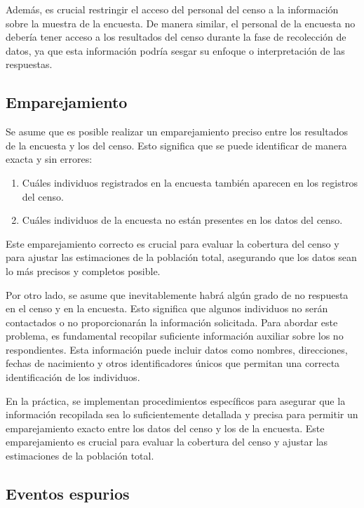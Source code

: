 \documentclass[
  12pt,
]{book}
\providecommand{\tightlist}{%
  \setlength{\itemsep}{0pt}\setlength{\parskip}{0pt}}
\begin{document}
Además, es crucial restringir el acceso del personal del censo a la información sobre la muestra de la encuesta. De manera similar, el personal de la encuesta no debería tener acceso a los resultados del censo durante la fase de recolección de datos, ya que esta información podría sesgar su enfoque o interpretación de las respuestas.

\subsection{Emparejamiento}\label{emparejamiento}

Se asume que es posible realizar un emparejamiento preciso entre los resultados de la encuesta y los del censo. Esto significa que se puede identificar de manera exacta y sin errores:

\begin{enumerate}
\def\labelenumi{\arabic{enumi}.}
\tightlist
\item
  Cuáles individuos registrados en la encuesta también aparecen en los registros del censo.
\item
  Cuáles individuos de la encuesta no están presentes en los datos del censo.
\end{enumerate}

Este emparejamiento correcto es crucial para evaluar la cobertura del censo y para ajustar las estimaciones de la población total, asegurando que los datos sean lo más precisos y completos posible.

Por otro lado, se asume que inevitablemente habrá algún grado de no respuesta en el censo y en la encuesta. Esto significa que algunos individuos no serán contactados o no proporcionarán la información solicitada. Para abordar este problema, es fundamental recopilar suficiente información auxiliar sobre los no respondientes. Esta información puede incluir datos como nombres, direcciones, fechas de nacimiento y otros identificadores únicos que permitan una correcta identificación de los individuos.

En la práctica, se implementan procedimientos específicos para asegurar que la información recopilada sea lo suficientemente detallada y precisa para permitir un emparejamiento exacto entre los datos del censo y los de la encuesta. Este emparejamiento es crucial para evaluar la cobertura del censo y ajustar las estimaciones de la población total.

\subsection{Eventos espurios}\label{eventos-espurios}
\end{document}
